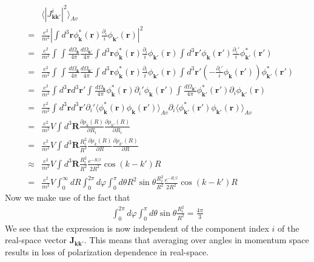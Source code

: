 \documentclass[aps,prb,reprint,noeprint,superscriptaddress]{revtex4-1}
\begin{document}
\begin{eqnarray*}
	&&\langle 
	\left|J^i_{\mathbf{k}\mathbf{k}'}\right|^2 
	\rangle_{Av}
	\\
	&=&
	\frac{e^2}{m^2} 
	\left|
	\int_{}^{} d^3\mathbf{r} \phi_\mathbf{k}^*(\mathbf{r})
	\frac{\partial_i}{i} \phi_{\mathbf{k}'}(\mathbf{r})
	\right|^2
	\\
	&=& \frac{e^2}{m^2} 
	\int_{}^{}\int_{}^{}\frac{d\Omega_\mathbf{k}}{4\pi}
	\frac{d\Omega_{\mathbf{k}'}}{4\pi}
		\int_{}^{} d^3\mathbf{r} \phi_\mathbf{k}^*(\mathbf{r})
		\frac{\partial_i}{i} \phi_{\mathbf{k}'}(\mathbf{r})
		\int_{}^{} d^3\mathbf{r}' \phi_\mathbf{k}(\mathbf{r}')
		 \frac{\partial_i'}{i} \phi_{\mathbf{k}'}^*(\mathbf{r'})
	\\
	&=& \frac{e^2}{m^2} 
	\int_{}^{}\int_{}^{}
	\frac{d\Omega_\mathbf{k}}{4\pi}
	\frac{d\Omega_{\mathbf{k}'}}{4\pi}
		\int_{}^{} d^3\mathbf{r} 
		\phi_\mathbf{k}^*(\mathbf{r})
		\frac{\partial_i}{i} \phi_{\mathbf{k}'}(\mathbf{r})
		\int_{}^{} d^3\mathbf{r}' 
		\left(-\frac{\partial_i'}{i}\phi_\mathbf{k}(\mathbf{r}')\right)
		\phi_{\mathbf{k}'}^*(\mathbf{r'})
	\\
	&=& \frac{e^2}{m^2} 
		\int_{}^{} d^3\mathbf{r} 
		d^3\mathbf{r}' 
	\int_{}^{}
	\frac{d\Omega_\mathbf{k}}{4\pi}
		\phi_\mathbf{k}^*(\mathbf{r})
		\partial_i'\phi_\mathbf{k}(\mathbf{r}')
	\int_{}^{}
	\frac{d\Omega_{\mathbf{k}'}}{4\pi}
		\phi_{\mathbf{k}'}^*(\mathbf{r'})
		\partial_i \phi_{\mathbf{k}'}(\mathbf{r})
	\\
	&=& \frac{e^2}{m^2} 
		\int_{}^{} d^3\mathbf{r} 
		d^3\mathbf{r}' 
		\partial_i'
		\langle 
		\phi_\mathbf{k}^*(\mathbf{r})
		\phi_\mathbf{k}(\mathbf{r}')
		\rangle_{Av}
		\partial_i 
		\langle 
		\phi_{\mathbf{k}'}^*(\mathbf{r'})
		\phi_{\mathbf{k}'}(\mathbf{r})
		\rangle_{Av}
	\\
	&=& \frac{e^2}{m^2} V
		\int_{}^{} d^3\mathbf{R} 
		\frac{\partial \rho_k(R)}{\partial R_i}
		\frac{\partial \rho_{k'}(R)}{\partial R_i}
	\\
	&=& \frac{e^2}{m^2} V
		\int_{}^{} d^3\mathbf{R} 
		\frac{R_i^2}{R^2}
		\frac{\partial \rho_k(R)}{\partial R}
		\frac{\partial \rho_{k'}(R)}{\partial R}
	\\
	&\approx& \frac{e^2}{m^2} V
		\int_{}^{} d^3\mathbf{R} 
		\frac{R_i^2}{R^2}
		\frac{e^{-R/l}}{2R^2} \cos (k-k')R
	\\
	&=& \frac{e^2}{m^2} V
		\int_{0}^{\infty}dR
		\int_{0}^{2\pi}d\varphi
		\int_{0}^{\pi}d\theta
		R^2 \sin \theta	
		\frac{R_i^2}{R^2}
		\frac{e^{-R/l}}{2R^2} \cos (k-k')R
\end{eqnarray*}
Now we make use of the fact that
\begin{eqnarray*}
		\int_{0}^{2\pi}d\varphi
		\int_{0}^{\pi}d\theta
		\sin \theta	
		\frac{R_i^2}{R^2}
		= \frac{4\pi}{3}
\end{eqnarray*}
We see that the expression is now independent of the component index $i$ of the
real-space vector $\mathbf{J}_{\mathbf{k}\mathbf{k}'}$. This means that
averaging over angles in momentum space results in loss of polarization
dependence in real-space.
\end{document}
